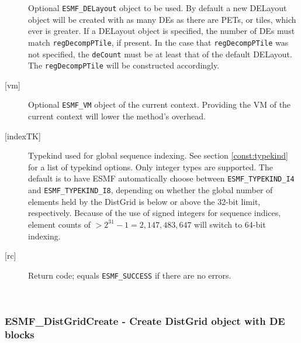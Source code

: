 \begin{description}
            Optional {\tt ESMF\_DELayout} object to be used. By default a new
            DELayout object will be created with as many DEs as there are PETs,
            or tiles, which ever is greater. If a DELayout object is specified,
            the number of DEs must match {\tt regDecompPTile}, if present. In the
            case that {\tt regDecompPTile} was not specified, the {\tt deCount}
            must be at least that of the default DELayout. The 
            {\tt regDecompPTile} will be constructed accordingly.
       \item[{[vm]}]
            Optional {\tt ESMF\_VM} object of the current context. Providing the
            VM of the current context will lower the method's overhead.
       \item[{[indexTK]}]
            Typekind used for global sequence indexing. See section 
            \ref{const:typekind} for a list of typekind options. Only integer
            types are supported. The default is to have ESMF automatically choose
            between {\tt ESMF\_TYPEKIND\_I4} and {\tt ESMF\_TYPEKIND\_I8},
            depending on whether the global number of elements held by the
            DistGrid is below or above the 32-bit limit, respectively.
            Because of the use of signed integers for sequence indices, 
            element counts of $ > 2^{31}-1 = 2,147,483,647$ will switch to 64-bit 
            indexing.
       \item[{[rc]}]
            Return code; equals {\tt ESMF\_SUCCESS} if there are no errors.
       \end{description}
   
 
\mbox{}\hrulefill\ 
 
\subsubsection [ESMF\_DistGridCreate] {ESMF\_DistGridCreate - Create DistGrid object with DE blocks}


